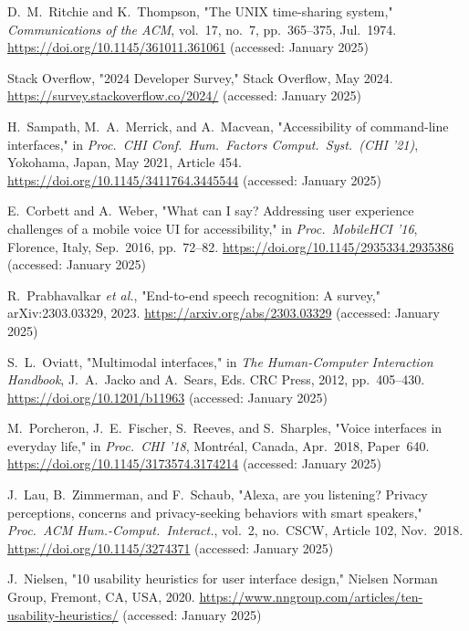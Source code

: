 \documentclass[a4paper,12pt]{article}
\begin{document}
\clearpage
\begin{thebibliography}{28}\itemsep0pt
 D.~M.~Ritchie and K.~Thompson, "The UNIX time-sharing system," \textit{Communications of the ACM}, vol.~17, no.~7, pp.~365--375, Jul.~1974. \url{https://doi.org/10.1145/361011.361061} (accessed: January 2025)

 Stack Overflow, "2024 Developer Survey," Stack Overflow, May 2024. \url{https://survey.stackoverflow.co/2024/} (accessed: January 2025)

 H.~Sampath, M.~A.~Merrick, and A.~Macvean, "Accessibility of command-line interfaces," in \textit{Proc.~CHI Conf.~Hum.~Factors Comput.~Syst.~(CHI '21)}, Yokohama, Japan, May 2021, Article 454. \url{https://doi.org/10.1145/3411764.3445544} (accessed: January 2025)



 E.~Corbett and A.~Weber, "What can I say? Addressing user experience challenges of a mobile voice UI for accessibility," in \textit{Proc.~MobileHCI '16}, Florence, Italy, Sep.~2016, pp.~72--82. \url{https://doi.org/10.1145/2935334.2935386} (accessed: January 2025)

 R.~Prabhavalkar \textit{et al.}, "End-to-end speech recognition: A survey," arXiv:2303.03329, 2023. \url{https://arxiv.org/abs/2303.03329} (accessed: January 2025)

 S.~L.~Oviatt, "Multimodal interfaces," in \textit{The Human-Computer Interaction Handbook}, J.~A.~Jacko and A.~Sears, Eds. CRC Press, 2012, pp.~405--430. \url{https://doi.org/10.1201/b11963} (accessed: January 2025)

 M.~Porcheron, J.~E.~Fischer, S.~Reeves, and S.~Sharples, "Voice interfaces in everyday life," in \textit{Proc.~CHI '18}, Montréal, Canada, Apr.~2018, Paper~640. \url{https://doi.org/10.1145/3173574.3174214} (accessed: January 2025)

 J.~Lau, B.~Zimmerman, and F.~Schaub, "Alexa, are you listening? Privacy perceptions, concerns and privacy-seeking behaviors with smart speakers," \textit{Proc.~ACM Hum.-Comput.~Interact.}, vol.~2, no.~CSCW, Article 102, Nov.~2018. \url{https://doi.org/10.1145/3274371} (accessed: January 2025)

 J.~Nielsen, "10 usability heuristics for user interface design," Nielsen Norman Group, Fremont, CA, USA, 2020. \url{https://www.nngroup.com/articles/ten-usability-heuristics/} (accessed: January 2025)


\end{thebibliography}
\end{document}
